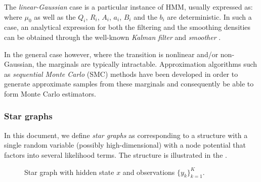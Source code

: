 The \emph{linear-Gaussian} case is a particular instance of HMM, usually expressed as:
where $\mu_0$ as well as the $Q_i$, $R_i$, $A_i$, $a_i$, $B_i$ and the $b_i$ are deterministic. In such a case, an analytical expression for both the filtering and the smoothing densities can be obtained through the well-known \emph{Kalman filter} and \emph{smoother} \citep{anderson79}. 

In the general case however, where the transition is nonlinear and/or non-Gaussian, the marginals are typically intractable. Approximation algorithms such as \emph{sequential Monte Carlo} (SMC) methods have been developed in order to generate approximate samples from these marginals and consequently be able to form Monte Carlo estimators. \addref{} 

\subsubsection{Star graphs}

In this document, we define \emph{star graphs} as corresponding to a structure with a single random variable (possibly high-dimensional) with a node potential that factors into several likelihood terms. The structure is illustrated in the . 

\begin{figure}[!h]
\center
{}
\caption{\label{fig:star1} Star graph with hidden state $x$ and observations $\{y_k\}_{k=1}^{K}$. }
\end{figure} 

